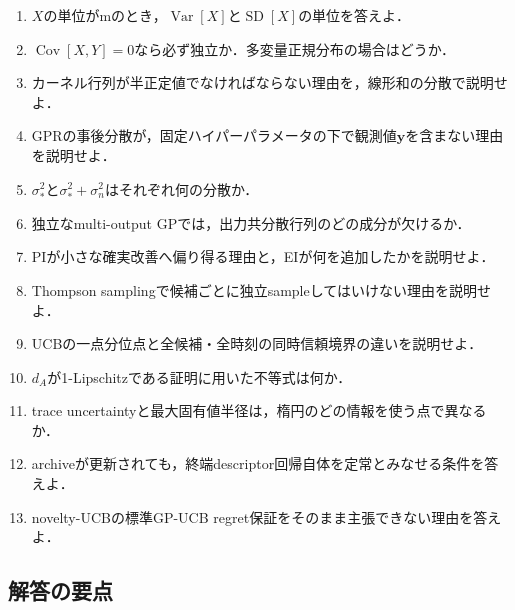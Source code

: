 \documentclass[a4paper,11pt]{ltjsarticle}
\newcommand{\Var}{\operatorname{Var}}
\newcommand{\Cov}{\operatorname{Cov}}
\begin{document}
\begin{enumerate}
  \item \(X\)の単位がmのとき，\(\Var[X]\)と\(\operatorname{SD}[X]\)の単位を答えよ．
  \item \(\Cov[X,Y]=0\)なら必ず独立か．多変量正規分布の場合はどうか．
  \item カーネル行列が半正定値でなければならない理由を，線形和の分散で説明せよ．
  \item GPRの事後分散が，固定ハイパーパラメータの下で観測値\(\bm y\)を含まない理由を説明せよ．
  \item \(\sigma_*^2\)と\(\sigma_*^2+\sigma_n^2\)はそれぞれ何の分散か．
  \item 独立なmulti-output GPでは，出力共分散行列のどの成分が欠けるか．
  \item PIが小さな確実改善へ偏り得る理由と，EIが何を追加したかを説明せよ．
  \item Thompson samplingで候補ごとに独立sampleしてはいけない理由を説明せよ．
  \item UCBの一点分位点と全候補・全時刻の同時信頼境界の違いを説明せよ．
  \item \(d_A\)が1-Lipschitzである証明に用いた不等式は何か．
  \item trace uncertaintyと最大固有値半径は，楕円のどの情報を使う点で異なるか．
  \item archiveが更新されても，終端descriptor回帰自体を定常とみなせる条件を答えよ．
  \item novelty-UCBの標準GP-UCB regret保証をそのまま主張できない理由を答えよ．
\end{enumerate}

\subsection*{解答の要点}
\end{document}
